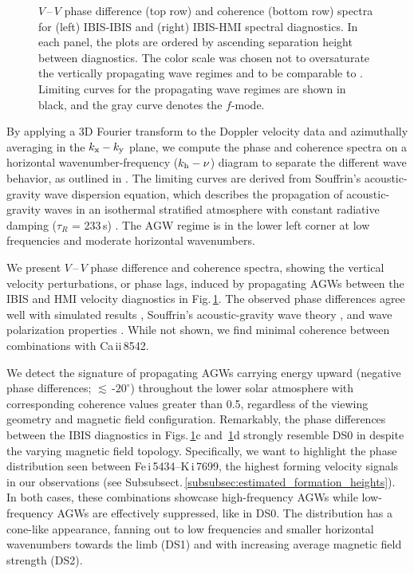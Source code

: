 \documentclass[preprint2,linenumbers]{aastex701}
\newcommand{\IBISCa}[1]{Ca\,{\sc ii}\,8542}
\newcommand{\IBISFeUpperPhot}[1]{Fe\,{\sc i}\,5434}
\newcommand{\IBISK}[1]{K\,{\sc i}\,7699}
\begin{document}
\begin{figure}[hbt!]
\ContinuedFloat
\captionsetup{list=off,format=cont}
\caption{$V$\,--\,$V$ phase difference (top row) and coherence (bottom row) spectra for (left) IBIS-IBIS and (right) IBIS-HMI spectral diagnostics. In each panel, the plots are ordered by ascending separation height between diagnostics. The color scale was chosen not to oversaturate the vertically propagating wave regimes and to be comparable to . Limiting curves for the propagating wave regimes are shown in black, and the gray curve denotes the $f$-mode.} \label{fig:vv_phase}
\end{figure}

By applying a 3D Fourier transform to the Doppler velocity data and azimuthally averaging in the $k_{\rm{x}}-k_{\rm{y}}$ plane, we compute the phase and coherence spectra on a horizontal wavenumber-frequency ($k_{\rm{h}}-\nu$) diagram \citep{1974_Deubner} to separate the different wave behavior, as outlined in .
The limiting curves are derived from Souffrin's acoustic-gravity wave dispersion equation, which describes the propagation of acoustic-gravity waves in an isothermal stratified atmosphere with constant radiative damping ($\tau_R$ = 233\,s) \citep{1966_Souffrin}. 
The AGW regime is in the lower left corner at low frequencies and moderate horizontal wavenumbers.

We present $V$\,--\,$V$ phase difference and coherence spectra, showing the vertical velocity perturbations, or phase lags, induced by propagating AGWs between the IBIS and HMI velocity diagnostics in Fig.\,\ref{fig:vv_phase}.
The observed phase differences agree well with simulated results \citep{2017_Vigeesh}, Souffrin's acoustic-gravity wave theory \citep{1966_Souffrin}, and wave polarization properties \citep{1981_Mihalas_Toomre, 1982_Mihalas_Toomre}.
While not shown, we find minimal coherence between combinations with \IBISCa{}.

We detect the signature of propagating AGWs carrying energy upward (negative phase differences; $\lesssim$\,-$20^\circ$) throughout the lower solar atmosphere with corresponding coherence values greater than 0.5, regardless of the viewing geometry and magnetic field configuration.
Remarkably, the phase differences between the IBIS diagnostics in Figs.\,\ref{fig:vv_phase}c and \,\ref{fig:vv_phase}d strongly resemble DS0 in  despite the varying magnetic field topology. 
Specifically, we want to highlight the phase distribution seen between \IBISFeUpperPhot{}--\IBISK{}, the highest forming velocity signals in our observations (see Subsubsect.\,\ref{subsubsec:estimated_formation_heights}).
In both cases, these combinations showcase high-frequency AGWs while low-frequency AGWs are effectively suppressed, like in DS0.
The distribution has a cone-like appearance, fanning out to low frequencies and smaller horizontal wavenumbers towards the limb (DS1) and with increasing average magnetic field strength (DS2).
\end{document}
